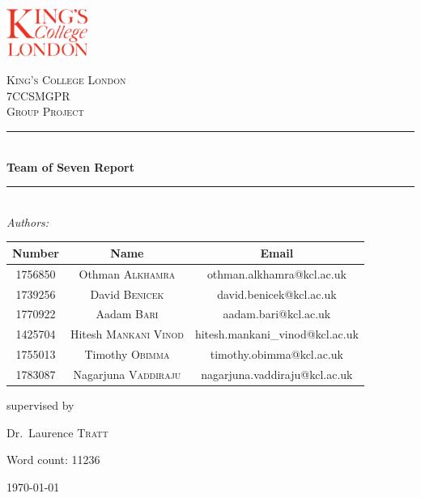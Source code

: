 \documentclass[a4paper]{report}
\begin{document}
	\begin{titlepage}
		\newcommand{\HRule}{\rule{\linewidth}{0.5mm}} %
		\newcommand{\hRule}{\rule{\linewidth}{0.1mm}} %
		\centering
		\includegraphics[width=0.2\textwidth]{kcl.png}\par\vspace{1cm}
		\textsc{\LARGE King's College London}\\[1.5cm] %
		\textsc{\large 7CCSMGPR}\\[0.5cm] %
		\textsc{\Large Group Project}\\[0.5cm] %
		\HRule\\[0.4cm]
		{\huge\bfseries Team of Seven Report}\\[0.4cm] %
		\HRule\\[1.5cm]
		\vspace{1cm}
		\textit{Authors: }\vspace{0.5cm}
		\begin{center}
			\begin{tabular}{ c|c|c } 
				\hline
				\textbf{Number} & \textbf{Name} & \textbf{Email} \\
				\hline
				1756850 & Othman \textsc{Alkhamra} &  othman.alkhamra@kcl.ac.uk \\ 
				\hline
				1739256 & David \textsc{Benicek} &  david.benicek@kcl.ac.uk \\ 
				\hline
				1770922 & Aadam \textsc{Bari} &  
				aadam.bari@kcl.ac.uk\\ 
				\hline
				1425704 & Hitesh \textsc{Mankani Vinod} &  hitesh.mankani\_vinod@kcl.ac.uk \\ 
				\hline
				1755013 & Timothy \textsc{Obimma} &  timothy.obimma@kcl.ac.uk \\ 
				\hline
				1783087 & Nagarjuna \textsc{Vaddiraju} &  nagarjuna.vaddiraju@kcl.ac.uk \\ 
				
				\hline
			\end{tabular}
		\end{center}
		
		\vfill
		supervised by\par
		Dr.~Laurence \textsc{Tratt}\par
		Word count: 11236
		\vfill
		{\large \today\par}
	\end{titlepage}
	\newpage
	\tableofcontents
	\newpage
\end{document}
